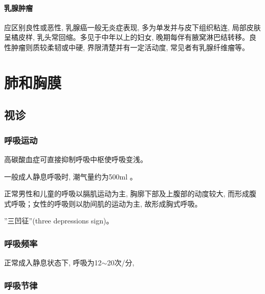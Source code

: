 \documentclass[UTF8]{ctexbook}
\begin{document}
\paragraph{乳腺肿瘤}应区别良性或恶性, 乳腺癌一般无炎症表现, 多为单发并与皮下组织粘连, 局部皮肤呈橘皮样, 乳头常回缩。多见于中年以上的妇女, 晚期每伴有腋窝淋巴结转移。良性肿瘤则质较柔韧或中硬, 界限清楚并有一定活动度, 常见者有乳腺纤维瘤等。
\section{肺和胸膜}
\subsection{视诊}
\subsubsection{呼吸运动}
高碳酸血症可直接抑制呼吸中枢使呼吸变浅。

一般成人静息呼吸时, 潮气量约为500ml 。

正常男性和儿童的呼吸以膈肌运动为主, 胸廓下部及上腹部的动度较大, 而形成腹式呼吸；女性的呼吸则以肋间肌的运动为主, 故形成胸式呼吸。

''三凹征''(three depressions sign)。

\subsubsection{呼吸频率}
正常成入静息状态下, 呼吸为12$\sim$20次/分,

\subsubsection{呼吸节律}
\end{document}
